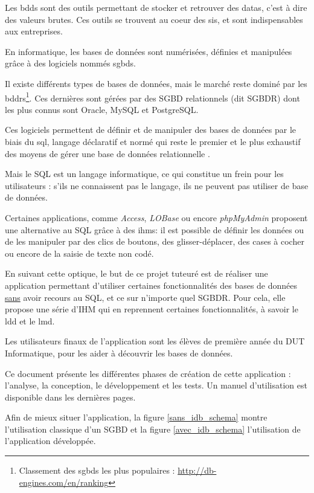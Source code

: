 Les \glspl{bdd} sont des outils permettant de stocker et retrouver des \glspl{data}, c'est à dire des valeurs brutes. 
Ces outils se trouvent au coeur des \glspl{si}, et sont indispensables aux entreprises.

En informatique, les bases de données sont numérisées, définies et manipulées grâce à des logiciels nommés \glspl{sgbd}.

Il existe différents types de bases de données, mais le marché reste dominé par les \glspl{bddr}\footnote{\label{part_de_marché_relationnel}
Classement des \glspl{sgbd} les plus populaires : \url{http://db-engines.com/en/ranking}}. Ces dernières sont gérées par des SGBD relationnels (dit SGBDR) 
dont les plus connus sont Oracle, MySQL et PostgreSQL.

Ces logiciels permettent de définir et de manipuler des bases de données par le biais du \gls{sql}, 
langage déclaratif et normé qui reste le premier et le plus exhaustif des moyens de gérer une base de données relationnelle .

Mais le SQL est un langage informatique, ce qui constitue un frein pour les utilisateurs : s'ils ne connaissent pas
le langage, ils ne peuvent pas utiliser de base de données.

Certaines applications, comme \textit{Access}, \textit{LOBase} ou encore \textit{phpMyAdmin} proposent une alternative au SQL grâce à des 
\glspl{ihm}: il est possible de définir les données ou de les manipuler par des clics de boutons, des glisser-déplacer, des cases à cocher ou encore de la saisie
de texte non codé. 

En suivant cette optique, le but de ce projet tuteuré est de réaliser une application permettant d'utiliser certaines fonctionnalités 
des bases de données \underline{sans} 
avoir recours au SQL, et ce sur n'importe quel SGBDR. Pour cela, elle propose une série d'IHM qui en reprennent certaines fonctionnalités,
à savoir le \gls{ldd} et le \gls{lmd}.

Les utilisateurs finaux de l'application sont les élèves de première année du DUT Informatique, pour
les aider à découvrir les bases de données.

Ce document présente les différentes phases de création de cette application : l'analyse, la conception, le développement et les tests.
Un manuel d'utilisation est disponible dans les dernières pages.

Afin de mieux situer l'application, la figure \ref{sans_idb_schema} montre l'utilisation classique d'un SGBD et 
la figure \ref{avec_idb_schema} l'utilisation de l'application développée.

